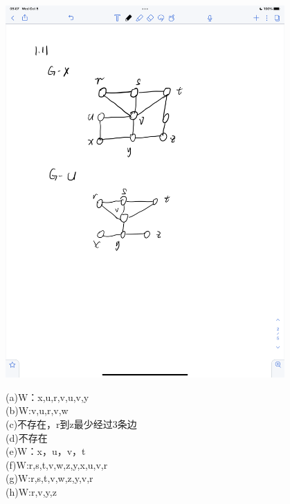 \documentclass[a4paper, justified]{tufte-handout}
\begin{document}
\begin{problem}[CZ 1.11]
\end{problem}

\begin{solution}
	\includegraphics[width = 0.8\textwidth]{1.11.png}
\end{solution}

\begin{problem}[CZ 1.12]
\end{problem}

\begin{solution}
	(a)W：x,u,r,v,u,v,y\\
	(b)W:v,u,r,v,w\\
	(c)不存在，r到z最少经过3条边\\
	(d)不存在\\
	(e)W：x，u，v，t\\
	(f)W:r,s,t,v,w,z,y,x,u,v,r\\
	(g)W:r,s,t,v,w,z,y,v,r\\
	(h)W:r,v,y,z
\end{solution}

\begin{problem}[CZ 1.24]
\end{problem}
\end{document}
